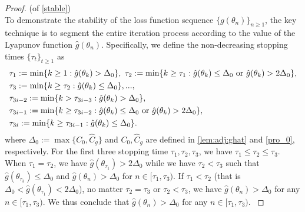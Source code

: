 \documentclass[standalone]{article}
\begin{document}
\begin{proof}(of \cref{stable}) \\
 To demonstrate the stability of the loss function sequence \(\{g(\theta_{n})\}_{n\ge 1}\), the key technique is to segment the entire iteration process according to the value of the Lyapunov function \(\hat{g}(\theta_{n})\). Specifically, we define the non-decreasing stopping times $\{\tau_{t}\}_{t\ge 1}$ as 
\begin{align}\label{stopping_time}
&\tau_{1}:=\min\{k\ge 1:\hat{g}(\theta_{k})>\Delta_0\},\ \tau_{2}:=\min\{k\ge \tau_{1}: \hat{g}(\theta_{k})\le  \Delta_0\ \text{or}\ \hat{g}(\theta_{k})>2\Delta_0\},\notag\\&\tau_{3}:=\min\{k\ge \tau_{2}:\hat{g}(\theta_{k})\le \Delta_0\},...,
\notag\\&\tau_{3i-2}:=\min\{k> \tau_{3i-3}:\hat{g}(\theta_{k})>\Delta_0\},\ \notag \\
&\tau_{3i-1}:=\min\{k\ge \tau_{3i-2}:\hat{g}(\theta_{k})\le  \Delta_0\ \text{or}\ \hat{g}(\theta_{k})>2\Delta_0\},\notag\\&\tau_{3i}:=\min\{k\ge  \tau_{3i-1}:\hat{g}(\theta_{k})\le  \Delta_0\}.
\end{align}
where $\Delta_0:=\max\{C_{0},\hat{C}_{g}\}$ and $C_0, \hat{C}_g$
are defined in \cref{lem:adj:ghat} and \cref{pro_0}, respectively.  
{For the first three stopping time $\tau_1, \tau_2, 
\tau_3$, we have $\tau_1 \leq \tau_2 \leq \tau_3$. When $\tau_1 = \tau_2$, we have $\hat{g}(\theta_{\tau_1}) > 2 \Delta_0$ while we have $\tau_2 < \tau_3$ such that $\hat{g}(\theta_{\tau_3}) \leq \Delta_0$ and $\hat{g}(\theta_n) > \Delta_0$ for $n \in [\tau_1, \tau_3)$. If $\tau_1 < \tau_2$ (that is $\Delta_0 < \hat{g}(\theta_{\tau_1}) < 2\Delta_0$), no matter $\tau_2 = \tau_3$ or $\tau_2 < \tau_3$, we have $\hat{g}(\theta_n) > \Delta_0$ for any $n \in [\tau_1, \tau_3)$. We thus conclude that $\hat{g}(\theta_n) > \Delta_0$ for any $n \in [\tau_{1}, \tau_3)$. }



\end{proof}
\end{document}
